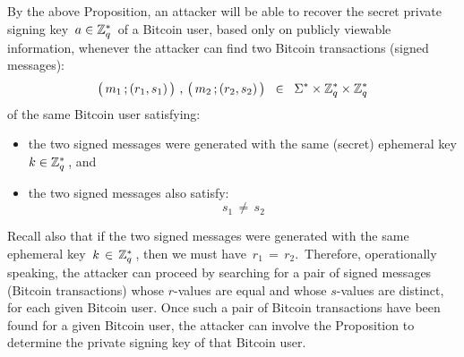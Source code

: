 \begin{remark}
\mbox{}
\vskip 0.1cm
\noindent
By the above Proposition, an attacker will be able to recover the secret
private signing key \,$a \in \mathbb{Z}_{q}^{*}$\, of a Bitcoin user, based only on
publicly viewable information, whenever the attacker can find two
Bitcoin transactions (signed messages):
\begin{equation*}
\left(\,m_{1}\,\overset{{\color{white}.}}{;}\,(r_{1},s_{1})\,\right)
\,,\,
\left(\,m_{2}\,\overset{{\color{white}.}}{;}\,(r_{2},s_{2})\,\right)
\;\; \in \;\;
	\Sigma^{*} \times \Z_{q}^{*} \times \Z_{q}^{*}
\end{equation*}
of the same Bitcoin user satisfying:
\begin{itemize}
\item
	the two signed messages were generated
	with the same (secret) ephemeral key $k \in \mathbb{Z}_{q}^{*}$\,,
	and
\item
	the two signed messages also satisfy:
	\begin{equation*}
	s_{1} \,\neq\, s_{2}
	\end{equation*}
\end{itemize}
Recall also that if the two signed messages were generated with the
same ephemeral key \,$k \,\in\, \mathbb{Z}_{q}^{*}$\,, then we must have
\,$r_{1} \,=\, r_{2}$.\,
Therefore, operationally speaking, the attacker can proceed by
searching for a pair of signed messages (Bitcoin transactions)
whose $r$-values are equal and whose $s$-values are distinct,
for each given Bitcoin user.
Once such a pair of Bitcoin transactions have been found
for a given Bitcoin user, the attacker can involve the
Proposition to determine the private signing key of that Bitcoin user.
\end{remark}

